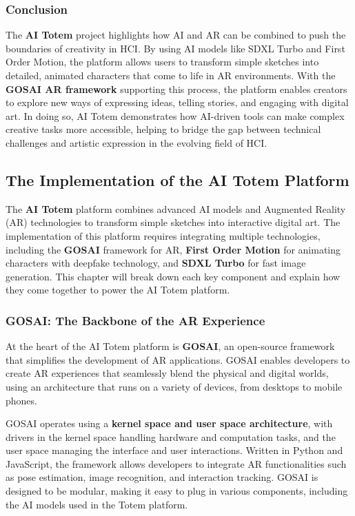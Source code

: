 \subsubsection{ Conclusion}

The \textbf{AI Totem} project highlights how AI and AR can be combined to push the boundaries of creativity in HCI.
By using AI models like SDXL Turbo and First Order Motion, the platform allows users to transform simple sketches into detailed, animated characters that come to life in AR environments.
With the \textbf{GOSAI AR framework} supporting this process, the platform enables creators to explore new ways of expressing ideas, telling stories, and engaging with digital art.
In doing so, AI Totem demonstrates how AI-driven tools can make complex creative tasks more accessible, helping to bridge the gap between technical challenges and artistic expression in the evolving field of HCI.

\subsection{The Implementation of the AI Totem Platform}

The \textbf{AI Totem} platform combines advanced AI models and Augmented Reality (AR) technologies to transform simple sketches into interactive digital art.
The implementation of this platform requires integrating multiple technologies, including the \textbf{GOSAI} framework for AR, \textbf{First Order Motion} for animating characters with deepfake technology, and \textbf{SDXL Turbo} for fast image generation.
This chapter will break down each key component and explain how they come together to power the AI Totem platform.

\subsubsection{ GOSAI: The Backbone of the AR Experience}

At the heart of the AI Totem platform is \textbf{GOSAI}, an open-source framework that simplifies the development of AR applications.
GOSAI enables developers to create AR experiences that seamlessly blend the physical and digital worlds, using an architecture that runs on a variety of devices, from desktops to mobile phones.

GOSAI operates using a \textbf{kernel space and user space architecture}, with drivers in the kernel space handling hardware and computation tasks, and the user space managing the interface and user interactions.
Written in Python and JavaScript, the framework allows developers to integrate AR functionalities such as pose estimation, image recognition, and interaction tracking.
GOSAI is designed to be modular, making it easy to plug in various components, including the AI models used in the Totem platform.

